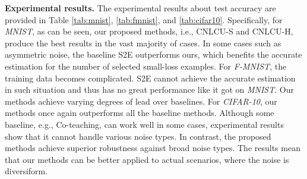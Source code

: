 \documentclass[11pt]{article}
\begin{document}
\textbf{Experimental results.} The experimental results about test accuracy are provided in Table \ref{tab:mnist}, \ref{tab:fmnist}, and \ref{tab:cifar10}. Specifically, for \textit{MNIST}, as can be seen, our proposed methods, i.e., CNLCU-S and CNLCU-H, produce the best results in the vast majority of cases. In some cases such as asymmetric noise, the baseline S2E outperforms ours, which benefits the accurate estimation for the number of selected small-loss examples. For  \textit{F-MNIST}, the training data becomes complicated. S2E cannot achieve the accurate estimation in such situation and thus has no great performance like it got on \textit{MNIST}. Our methods achieve varying degrees of lead over baselines. For \textit{CIFAR-10}, our methods once again outperforms all the baseline methods. Although some baseline, e.g., Co-teaching, can work well in some cases, experimental results show that it cannot handle various noise types. In contrast, the proposed methods achieve superior robustness against broad noise types. The results mean that our methods can be better applied to actual scenarios, where the noise is diversiform. 
\end{document}
